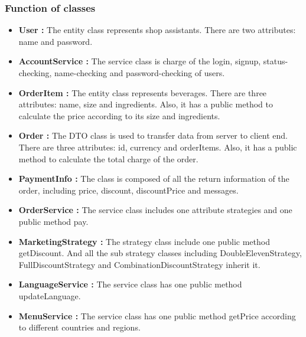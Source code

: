 \documentclass[a4paper]{report}
\begin{document}
\subsubsection{Function of classes}
\begin{itemize}
\item \textbf{User :} The entity class represents shop assistants. There are two attributes: name and password.
\item \textbf{AccountService :} The service class is charge of the login, signup, status-checking, name-checking and password-checking of users.
\item \textbf{OrderItem :} The entity class represents beverages. There are three attributes: name, size and ingredients. Also, it has a public method to calculate the price according to its size and ingredients.
\item \textbf{Order :} The DTO class is used to transfer data from server to client end. There are three attributes: id, currency and orderItems. Also, it has a public method to calculate the total charge of the order. 
\item \textbf{PaymentInfo :} The class is composed of all the return information of the order, including price, discount, discountPrice and messages.
\item \textbf{OrderService :} The service class includes one attribute strategies and one public method pay.
\item \textbf{MarketingStrategy :} The strategy class include one public method getDiscount. And all the  sub strategy classes including  DoubleElevenStrategy, FullDiscountStrategy and CombinationDiscountStrategy inherit it.
\item \textbf{LanguageService :} The service class has one public method updateLanguage.
\item \textbf{MenuService :} The service class has one public method getPrice according to different countries and regions.
\end{itemize}
\end{document}
